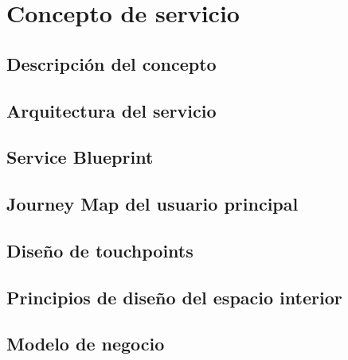 \section{Concepto de servicio}\label{sec:concepto}

\subsection{Descripción del concepto}\label{sec:concepto-descripcion}
\begin{pendiente}
\end{pendiente}

\subsection{Arquitectura del servicio}\label{sec:arquitectura-servicio}
\begin{pendiente}
\end{pendiente}

\subsection{Service Blueprint}\label{sec:service-blueprint}
\begin{pendiente}
\end{pendiente}

\subsection{Journey Map del usuario principal}\label{sec:journey-map}
\begin{pendiente}
\end{pendiente}

\subsection{Diseño de touchpoints}\label{sec:touchpoints}
\begin{pendiente}
\end{pendiente}

\subsection{Principios de diseño del espacio interior}\label{sec:diseno-interior}
\begin{pendiente}
\end{pendiente}

\subsection{Modelo de negocio}\label{sec:modelo-negocio}
\begin{pendiente}
\end{pendiente}

